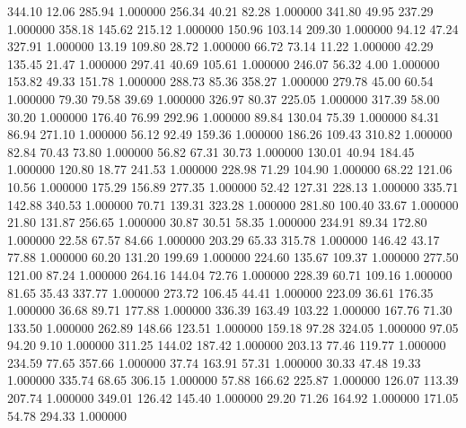     344.10     12.06    285.94  1.000000
    256.34     40.21     82.28  1.000000
    341.80     49.95    237.29  1.000000
    358.18    145.62    215.12  1.000000
    150.96    103.14    209.30  1.000000
     94.12     47.24    327.91  1.000000
     13.19    109.80     28.72  1.000000
     66.72     73.14     11.22  1.000000
     42.29    135.45     21.47  1.000000
    297.41     40.69    105.61  1.000000
    246.07     56.32      4.00  1.000000
    153.82     49.33    151.78  1.000000
    288.73     85.36    358.27  1.000000
    279.78     45.00     60.54  1.000000
     79.30     79.58     39.69  1.000000
    326.97     80.37    225.05  1.000000
    317.39     58.00     30.20  1.000000
    176.40     76.99    292.96  1.000000
     89.84    130.04     75.39  1.000000
     84.31     86.94    271.10  1.000000
     56.12     92.49    159.36  1.000000
    186.26    109.43    310.82  1.000000
     82.84     70.43     73.80  1.000000
     56.82     67.31     30.73  1.000000
    130.01     40.94    184.45  1.000000
    120.80     18.77    241.53  1.000000
    228.98     71.29    104.90  1.000000
     68.22    121.06     10.56  1.000000
    175.29    156.89    277.35  1.000000
     52.42    127.31    228.13  1.000000
    335.71    142.88    340.53  1.000000
     70.71    139.31    323.28  1.000000
    281.80    100.40     33.67  1.000000
     21.80    131.87    256.65  1.000000
     30.87     30.51     58.35  1.000000
    234.91     89.34    172.80  1.000000
     22.58     67.57     84.66  1.000000
    203.29     65.33    315.78  1.000000
    146.42     43.17     77.88  1.000000
     60.20    131.20    199.69  1.000000
    224.60    135.67    109.37  1.000000
    277.50    121.00     87.24  1.000000
    264.16    144.04     72.76  1.000000
    228.39     60.71    109.16  1.000000
     81.65     35.43    337.77  1.000000
    273.72    106.45     44.41  1.000000
    223.09     36.61    176.35  1.000000
     36.68     89.71    177.88  1.000000
    336.39    163.49    103.22  1.000000
    167.76     71.30    133.50  1.000000
    262.89    148.66    123.51  1.000000
    159.18     97.28    324.05  1.000000
     97.05     94.20      9.10  1.000000
    311.25    144.02    187.42  1.000000
    203.13     77.46    119.77  1.000000
    234.59     77.65    357.66  1.000000
     37.74    163.91     57.31  1.000000
     30.33     47.48     19.33  1.000000
    335.74     68.65    306.15  1.000000
     57.88    166.62    225.87  1.000000
    126.07    113.39    207.74  1.000000
    349.01    126.42    145.40  1.000000
     29.20     71.26    164.92  1.000000
    171.05     54.78    294.33  1.000000
